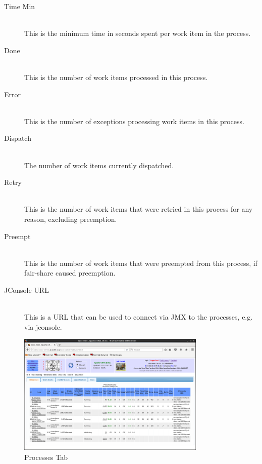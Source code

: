 \begin{description}
          \item[Time Min] \hfill \\
            This is the minimum time in seconds spent per work item in the process.
            
          \item[Done] \hfill \\
            This is the number of work items processed in this process.
            
          \item[Error] \hfill \\
            This is the number of exceptions processing work items in this process.
                      
          \item[Dispatch] \hfill \\
            The number of work items currently dispatched.
              
          \item[Retry] \hfill \\
            This is the number of work items that were retried in this process for any reason, excluding
            preemption.
            
          \item[Preempt] \hfill \\
            This is the number of work items that were preempted from this process, if
            fair-share caused preemption.
            
          \item[JConsole URL] \hfill \\
            This is a URL that can be used to connect via JMX to the processes, e.g. via
            jconsole.

      \end{description}
      
    \begin{figure}[ht!]
    \centering
    \includegraphics[width=90mm]{images/ducc-webserver/Job-Details-Processes.png}
    \caption{Processes Tab}
    \end{figure}
    
